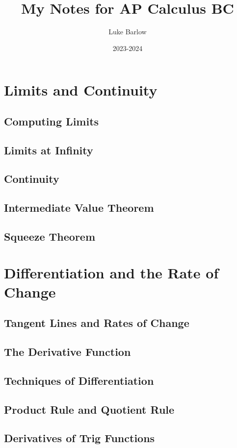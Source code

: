 \documentclass[letterpaper]{report}
\title{My Notes for AP Calculus BC}
\author{Luke Barlow}
\date{2023-2024}
\theoremstyle{definition}
\begin{document}
\maketitle
\tableofcontents

\chapter{Limits and Continuity}
\section{Computing Limits}
\section{Limits at Infinity}
\section{Continuity}
\section{Intermediate Value Theorem}
\section{Squeeze Theorem}

\chapter{Differentiation and the Rate of Change}
\section{Tangent Lines and Rates of Change}
\section{The Derivative Function}
\section{Techniques of Differentiation}
\section{Product Rule and Quotient Rule}
\section{Derivatives of Trig Functions}
\end{document}
